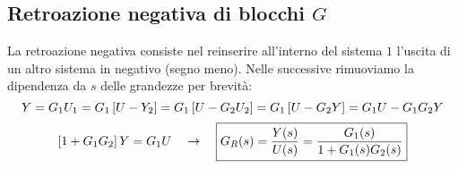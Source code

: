 \subsection{Retroazione negativa di blocchi $G$}
\bb
La retroazione negativa consiste nel reinserire all'interno del sistema $1$ l'uscita di un altro sistema in negativo (segno meno). Nelle successive rimuoviamo la dipendenza da $s$ delle grandezze per brevità: 
\begin{equation*}
Y = G_1 U_1 = G_1 \left[ U-Y_2 \right] = G_1 \left[ U-G_2U_2 \right] = G_1 \left[ U-G_2Y \right] = G_1U-G_1G_2Y
\end{equation*}
\begin{equation}
\left[ 1+G_1G_2 \right]Y = G_1U \quad \rightarrow \quad \boxed{G_R(s) = \frac{Y(s)}{U(s)} =  \frac{G_1(s)}{1+G_1(s)G_2(s)}}
\end{equation}


















